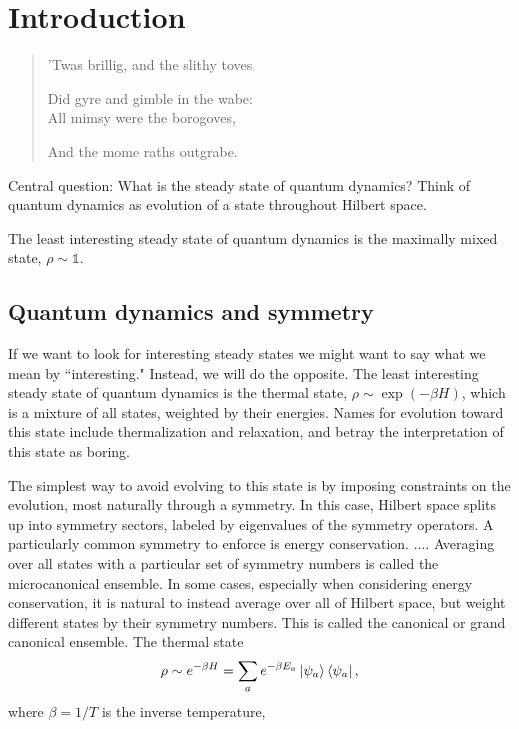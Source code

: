
\chapter{Introduction}
\label{chp:intro}

\begin{quotation}
	\noindent 'Twas brillig, and the slithy toves \par
	Did gyre and gimble in the wabe:\\
	All mimsy were the borogoves,\par
	And the mome raths outgrabe. 
\end{quotation}

Central question: What is the steady state of quantum dynamics? Think of quantum dynamics as evolution of a state throughout Hilbert space.

The least interesting steady state of quantum dynamics is the maximally mixed state, $\rho \sim \mathds{1}$.

\section{Quantum dynamics and symmetry}

If we want to look for interesting steady states we might want to say what we mean by ``interesting." Instead, we will do the opposite.
The least interesting steady state of quantum dynamics is the thermal state, $\rho \sim \exp (-\beta H)$, which is a mixture of all states, weighted by their energies. Names for evolution toward this state include thermalization and relaxation, and betray the interpretation of this state as boring. 

The simplest way to avoid evolving to this state is by imposing constraints on the evolution, most naturally through a symmetry. In this case, Hilbert space splits up into symmetry sectors, labeled by eigenvalues of the symmetry operators. A particularly common symmetry to enforce is energy conservation. .... Averaging over all states with a particular set of symmetry numbers is called the microcanonical ensemble. In some cases, especially when considering energy conservation, it is natural to instead average over all of Hilbert space, but weight different states by their symmetry numbers. This is called the canonical or grand canonical ensemble. The thermal state
\begin{align}
\rho \sim e^{-\beta H} = \sum_a e^{-\beta E_a} \ket{\psi_a} \bra{\psi_a},
\end{align}
where $\beta = 1/T$ is the inverse temperature, 

